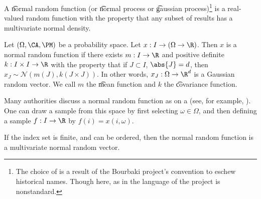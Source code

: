 

A \t{normal random function} (or \t{normal process} or \t{gaussian process})\footnote{The choice of  is a result of the Bourbaki project's convention to eschew historical names. Though here, as in  the language of the project is nonstandard.} is a real-valued random function with the property that any subset of results has a multivariate normal density.

Let $(\Omega, \CA, \PM)$ be a probability space.
Let $x: I \to (\Omega \to \R)$.
Then $x$ is a normal random function if there exists $m: I \to \R$ and positive definite $k: I \times I \to \R$ with the property that if $J \subset I$, $\abs{J} = d$, then $x_J \sim \mathcal{N}(m(J), k(J \times J))$.
In other words, $x_J: \Omega \to \R^d$ is a Gaussian random vector.
We call $m$ the \t{mean function} and $k$ the \t{covariance function}.


Many authorities discuss a normal random function as  on a  (see, for example, ).
One can draw a sample from this space by first selecting $\omega \in \Omega$, and then defining a sample $f: I \to \R$ by $f(i) = x(i, \omega)$.


If the index set is finite, and can be ordered, then the normal random function is a multivariate normal random vector.

\blankpage
